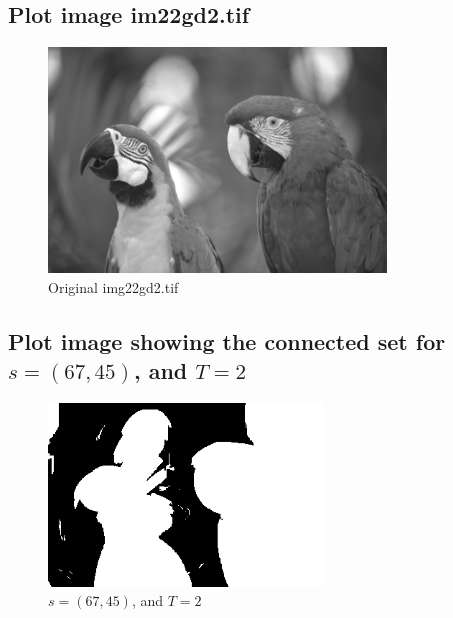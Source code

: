 \documentclass{article}
\begin{document}
\subsection{Plot image im22gd2.tif}
	\begin{figure}[h]
		\begin{center}
			\includegraphics[width=0.8\textwidth]{img22gd2.png}
			\caption{Original img22gd2.tif}
		\end{center}
	\end{figure}

\pagebreak

\subsection{Plot image showing the connected set for $s=(67,45)$, and $T=2$}
	\begin{figure}[h]
		\begin{center}
			\includegraphics[width=0.65\textwidth]{img22gd2_af1.png}
			\caption{$s=(67,45)$, and $T=2$}
		\end{center}
	\end{figure}
\end{document}
